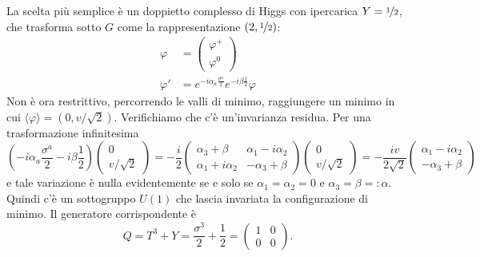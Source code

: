 \documentclass[italian,a4paper]{article}
\theoremstyle{definition}
\begin{document}
\begin{description}
    La scelta pi\`u semplice \`e un doppietto complesso di Higgs con
    ipercarica $Y = \nicefrac{1}{2}$, che trasforma sotto $G$ come la
    rappresentazione $(2, \nicefrac{1}{2})$:
    \begin{align*}
        \varphi &= 
        \begin{pmatrix}
            \varphi^+ \\
            \varphi^0
        \end{pmatrix}\\
        \varphi' &= e^{-i \alpha_a \frac{\sigma^a}{2}}e^{-i\beta
        \frac{1}{2}}\varphi
    \end{align*}
    Non \`e ora restrittivo, percorrendo le valli di minimo, raggiungere un
    minimo in cui $\langle \varphi \rangle = (0, v/\sqrt{2})$. Verifichiamo
    che c'\`e un'invarianza residua. Per una trasformazione infinitesima
    \begin{equation*}
        (-i \alpha_a \dfrac{\sigma^a}{2} -i \beta \dfrac{1}{2})
        \begin{pmatrix}
            0 \\
            v/\sqrt{2}
        \end{pmatrix} = 
        -\dfrac{i}{2}
        \begin{pmatrix}
            \alpha_3 + \beta & \alpha_1 -i \alpha_2\\
            \alpha_1 + i \alpha_2 & -\alpha_3 + \beta
        \end{pmatrix}
        \begin{pmatrix}
            0\\
            v/\sqrt{2}
        \end{pmatrix}
        =
        -\dfrac{iv}{2\sqrt{2}}
        \begin{pmatrix}
            \alpha_1 - i \alpha_2\\
            -\alpha_3 + \beta
        \end{pmatrix}
    \end{equation*}
    e tale variazione \`e nulla evidentemente se e solo se $\alpha_1 =
    \alpha_2 = 0$ e $\alpha_3 = \beta =\mathop: \alpha$. Quindi c'\`e un
    sottogruppo $U(1)$ che lascia invariata la configurazione di minimo. Il
    generatore corrispondente \`e
    \begin{equation*}
        Q = T^3 + Y = \dfrac{\sigma^3}{2} + \dfrac{1}{2} = 
        \begin{pmatrix}
            1 & 0\\
            0 & 0
        \end{pmatrix}.
    \end{equation*}
\end{description}
\end{document}
